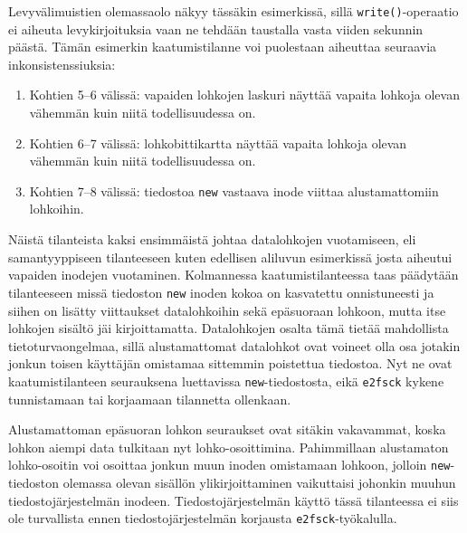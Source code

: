 Levyvälimuistien olemassaolo näkyy tässäkin esimerkissä,
sillä \texttt{write()}-operaatio ei aiheuta levykirjoituksia vaan ne tehdään taustalla vasta viiden sekunnin päästä.
Tämän esimerkin kaatumistilanne voi puolestaan aiheuttaa seuraavia inkonsistenssiuksia:
\begin{enumerate}
    \item{Kohtien 5--6 välissä: vapaiden lohkojen laskuri näyttää vapaita lohkoja olevan vähemmän kuin niitä todellisuudessa on.}
    \item{Kohtien 6--7 välissä: lohkobittikartta näyttää vapaita lohkoja olevan vähemmän kuin niitä todellisuudessa on.}
    \item{Kohtien 7--8 välissä: tiedostoa \texttt{new} vastaava inode viittaa alustamattomiin lohkoihin.}
\end{enumerate}
%
Näistä tilanteista kaksi ensimmäistä johtaa datalohkojen vuotamiseen,
eli samantyyppiseen tilanteeseen kuten edellisen aliluvun esimerkissä josta aiheutui vapaiden inodejen vuotaminen.
Kolmannessa kaatumistilanteessa taas päädytään tilanteeseen missä tiedoston \texttt{new} inoden kokoa on kasvatettu onnistuneesti ja siihen on lisätty viittaukset datalohkoihin sekä epäsuoraan lohkoon,
mutta itse lohkojen sisältö jäi kirjoittamatta.
Datalohkojen osalta tämä tietää mahdollista tietoturvaongelmaa,
sillä alustamattomat datalohkot ovat voineet olla osa jotakin jonkun toisen käyttäjän omistamaa sittemmin poistettua tiedostoa.
Nyt ne ovat kaatumistilanteen seurauksena luettavissa \texttt{new}-tiedostosta,
eikä \texttt{e2fsck} kykene tunnistamaan tai korjaamaan tilannetta ollenkaan.

Alustamattoman epäsuoran lohkon seuraukset ovat sitäkin vakavammat,
koska lohkon aiempi data tulkitaan nyt lohko-osoittimina.
Pahimmillaan alustamaton lohko-osoitin voi osoittaa jonkun muun inoden omistamaan lohkoon,
jolloin \texttt{new}-tiedoston olemassa olevan sisällön ylikirjoittaminen vaikuttaisi johonkin muuhun tiedostojärjestelmän inodeen.
Tiedostojärjestelmän käyttö tässä tilanteessa ei siis ole turvallista ennen tiedostojärjestelmän korjausta \texttt{e2fsck}-työkalulla.


